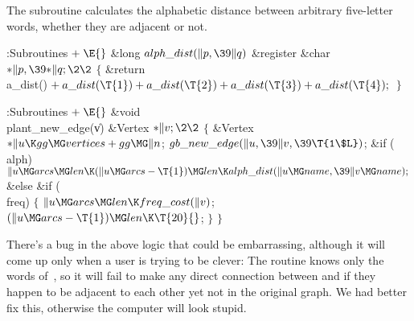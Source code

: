 The  subroutine calculates the alphabetic distance
between
arbitrary five-letter words, whether they are adjacent or not.

\Y\B\4:Subroutines\X${}\mathrel+\E{}$\6
\1\1\&{long} ${}\\{alph\_dist}(\|p,\39\|q){}$\6
\&{register} \&{char} ${}{*}\|p,\39{*}\|q;\2\2{}$\6
${}\{{}$\1\6
\&{return} \\{a\_dist}()${}+\\{a\_dist}(\T{1})+\\{a\_dist}(\T{2})+\\{a%
\_dist}(\T{3})+\\{a\_dist}(\T{4});{}$\6
\4${}\}{}$\2\par
\fi

\B{}:Subroutines\X${}\mathrel+\E{}$\6
\1\1\&{void} \\{plant\_new\_edge}(\|v)\6
\&{Vertex} ${}{*}\|v;\2\2{}$\6
${}\{{}$\5
\1\&{Vertex} ${}{*}\|u\K\\{gg}\MG\\{vertices}+\\{gg}\MG\|n{}$;\7
${}\\{gb\_new\_edge}(\|u,\39\|v,\39\T{1\$L}){}$;\6
\&{if} (\\{alph})\1\5
${}\|u\MG\\{arcs}\MG\\{len}\K(\|u\MG\\{arcs}-\T{1})\MG\\{len}\K\\{alph\_dist}(%
\|u\MG\\{name},\39\|v\MG\\{name});{}$\2\6
\&{else} \&{if} (\\{freq})\5
${}\{{}$\1\6
${}\|u\MG\\{arcs}\MG\\{len}\K\\{freq\_cost}(\|v){}$;\6
${}(\|u\MG\\{arcs}-\T{1})\MG\\{len}\K\T{20}{}$;\6
\4${}\}{}$\2\6
\4${}\}{}$\2\par
\fi

There's a bug in the above logic that could be embarrassing,
although it will come up only when a user is trying to be clever: The
 routine knows only the words of~, so it will fail
to
make any direct connection between  and  if they
happen
to be adjacent to each other yet not in the original graph. We had
better fix this, otherwise the computer will look stupid.

